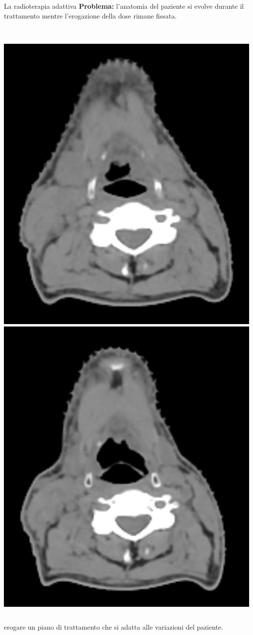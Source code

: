 \documentclass{beamer}
\begin{document}
\begin{frame}{La radioterapia adattiva}
\footnotesize
\alert{\bf Problema:} l'anatomia del paziente si evolve durante il trattamento mentre l'erogazione della dose rimane fissata.\\ \vspace{.5cm}
\begin{columns}
\centering
\small
{} \\ \vspace{.1cm}
\includegraphics[width=.8\textwidth]{./img/Slice_INIZIO_c.png}
\centering
\small
{}\\ \vspace{.1cm}
\includegraphics[width=.8\textwidth]{./img/Slice_FINE_c.png}
\end{columns}
\vspace{.3cm}

 erogare un piano di trattamento che si adatta alle variazioni del paziente.
\end{frame}
\end{document}
